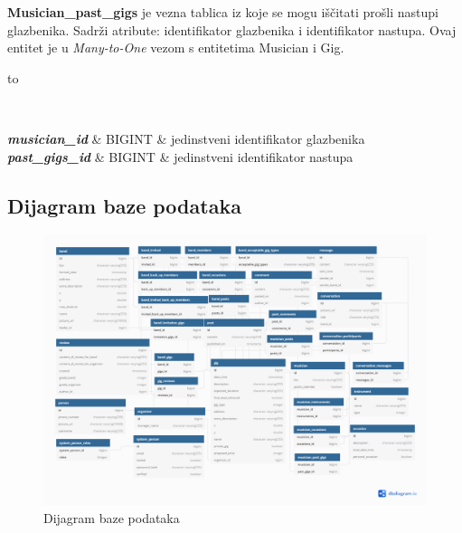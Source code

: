 		\textbf{Musician\_past\_gigs} je vezna tablica iz koje se mogu iščitati prošli nastupi glazbenika. Sadrži atribute: identifikator glazbenika i identifikator nastupa. Ovaj entitet je u \textit{Many-to-One} vezom s entitetima Musician i Gig.
	\begin{longtabu} to \textwidth {|X[6, l+3]|X[6, l]|X[20, l]|}
		
		\hline {}	 \\[3pt] \hline
		\endfirsthead
		
		\hline 
		\endlastfoot
		
		\textbf{\textit{musician\_id}} & BIGINT & jedinstveni identifikator glazbenika \\ \hline
		\textbf{\textit{past\_gigs\_id}} & BIGINT & jedinstveni identifikator nastupa \\ \hline
		
		
		
	\end{longtabu}
	


			
			\subsection{Dijagram baze podataka}
			
			\begin{figure}[H]
			\begin{center}
				\includegraphics[width=17cm]{slike/ERModel.PNG}
			\end{center}
			\caption{Dijagram baze podataka}
			\label{fig:dijagramBaze}
		\end{figure}
			
